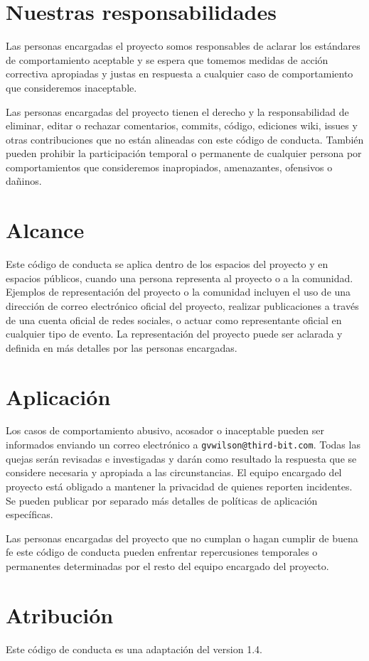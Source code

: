 \section*{Nuestras responsabilidades}

Las personas encargadas el proyecto somos responsables de aclarar los estándares de
comportamiento aceptable y se espera que tomemos medidas de acción correctiva 
apropiadas y justas en respuesta a cualquier caso de comportamiento que 
consideremos inaceptable.

Las personas encargadas del proyecto tienen el derecho y la responsabilidad de 
eliminar, editar o rechazar comentarios, commits, código, ediciones wiki, issues y otras
contribuciones que no están alineadas con este código de conducta. También pueden 
prohibir la participación temporal o permanente de cualquier persona por comportamientos 
que consideremos inapropiados, amenazantes, ofensivos o da\~ninos.

\section*{Alcance}

Este código de conducta se aplica dentro de los espacios del proyecto 
y en espacios públicos, cuando una persona representa al proyecto o a
la comunidad. Ejemplos de representación del proyecto o la comunidad incluyen
el uso de una dirección de correo electrónico oficial del proyecto, 
realizar publicaciones a través de una cuenta oficial de redes sociales, 
o actuar como representante oficial en cualquier tipo de evento. 
La representación del proyecto puede ser aclarada y definida en más
detalles por las personas encargadas.

\section*{Aplicación}

Los casos de comportamiento abusivo, acosador o inaceptable 
pueden ser informados enviando un correo electrónico a \texttt{gvwilson@third-bit.com}. 
Todas las quejas serán revisadas e investigadas y darán como resultado 
la respuesta que se considere necesaria y apropiada a las circunstancias.
El equipo encargado del proyecto está obligado a mantener la privacidad de 
quienes reporten incidentes.  Se pueden publicar por separado más detalles 
de políticas de aplicación específicas.

Las personas encargadas del proyecto que no cumplan o hagan cumplir 
de buena fe este código de conducta pueden enfrentar repercusiones 
temporales o permanentes determinadas por el resto del equipo encargado 
del proyecto.

\section*{Atribución}

Este código de conducta es una adaptación del 
 version 1.4.
